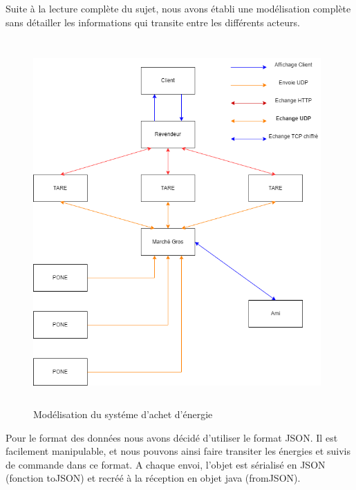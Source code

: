 Suite à la lecture complète du sujet, nous avons établi une modélisation complète sans détailler les informations qui transite entre les différents acteurs. 
\\


\begin{figure}[h]
    \centering
    \includegraphics[width=110mm, height=140mm]{images/SchemaFonctionnement.png}
    \caption{Modélisation du systéme d'achet d'énergie}
    \label{img:mesh15}
\end{figure}
Pour le format des données nous avons décidé d'utiliser le format JSON. Il est facilement manipulable, et nous pouvons ainsi faire transiter les énergies et suivis de commande dans ce format. A chaque envoi, l'objet est sérialisé en JSON (fonction toJSON) et recréé à la réception en objet java (fromJSON).
\newpage